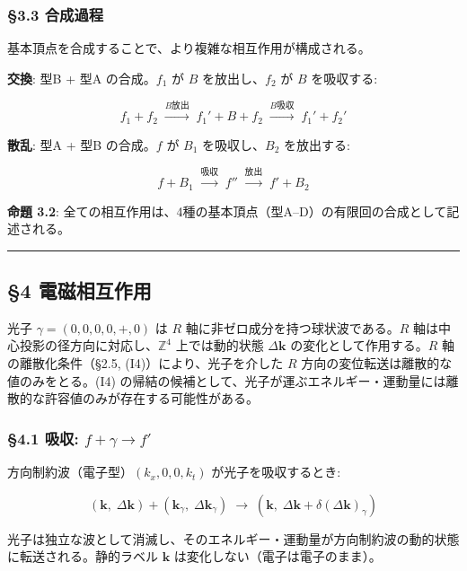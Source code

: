 \documentclass[
  a4paper,11pt]{ltjsarticle}
\theoremstyle{definition}
\theoremstyle{remark}
\begin{document}
\subsubsection{§3.3 合成過程}\label{ux5408ux6210ux904eux7a0b}

基本頂点を合成することで、より複雑な相互作用が構成される。

\textbf{交換}: 型B + 型A の合成。\(f_1\) が \(B\) を放出し、\(f_2\) が
\(B\) を吸収する:

\[f_1 + f_2 \;\xrightarrow{B\text{放出}}\; f_1' + B + f_2 \;\xrightarrow{B\text{吸収}}\; f_1' + f_2'\]

\textbf{散乱}: 型A + 型B の合成。\(f\) が \(B_1\) を吸収し、\(B_2\)
を放出する:

\[f + B_1 \;\xrightarrow{\text{吸収}}\; f'' \;\xrightarrow{\text{放出}}\; f' + B_2\]

\textbf{命題 3.2}:
全ての相互作用は、4種の基本頂点（型A--D）の有限回の合成として記述される。

\begin{center}\rule{0.5\linewidth}{0.5pt}\end{center}

\subsection{§4 電磁相互作用}\label{ux96fbux78c1ux76f8ux4e92ux4f5cux7528}

光子 \(\gamma = (0, 0, 0, 0, +, 0)\) は \(R\)
軸に非ゼロ成分を持つ球状波である。\(R\)
軸は中心投影の径方向に対応し、\(\mathbb{Z}^4\) 上では動的状態
\(\Delta\mathbf{k}\) の変化として作用する。\(R\) 軸の離散化条件（§2.5,
(I4)）により、光子を介した \(R\)
方向の変位転送は離散的な値のみをとる。(I4)
の帰結の候補として、光子が運ぶエネルギー・運動量には離散的な許容値のみが存在する可能性がある。

\subsubsection{\texorpdfstring{§4.1 吸収:
\(f + \gamma \to f'\)}{§4.1 吸収: f + \textbackslash gamma \textbackslash to f\textquotesingle{}}}\label{ux5438ux53ce-f-gamma-to-f}

方向制約波（電子型）\((k_x, 0, 0, k_t)\) が光子を吸収するとき:

\[(\mathbf{k},\; \Delta\mathbf{k}) + (\mathbf{k}_\gamma,\; \Delta\mathbf{k}_\gamma) \;\longrightarrow\; (\mathbf{k},\; \Delta\mathbf{k} + \delta(\Delta\mathbf{k})_\gamma)\]

光子は独立な波として消滅し、そのエネルギー・運動量が方向制約波の動的状態に転送される。静的ラベル
\(\mathbf{k}\) は変化しない（電子は電子のまま）。
\end{document}
